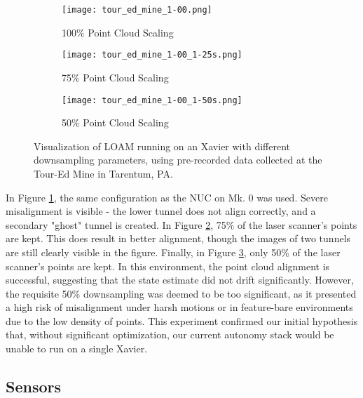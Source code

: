 \begin{figure}
	\centering
	\begin{subfigure}{0.3\textwidth}
		\texttt{[image: tour\_ed\_mine\_1-00.png]}
		\caption{100\% Point Cloud Scaling}
		\label{loam_xavier_100}
	\end{subfigure}		
	\hfill
	\begin{subfigure}{0.3\textwidth}
		\texttt{[image: tour\_ed\_mine\_1-00\_1-25s.png]}
		\caption{75\% Point Cloud Scaling}
		\label{loam_xavier_75}		
	\end{subfigure}
	\hfill
	\begin{subfigure}{0.3\textwidth}
		\texttt{[image: tour\_ed\_mine\_1-00\_1-50s.png]}
		\caption{50\% Point Cloud Scaling}
		\label{loam_xavier_50}
	\end{subfigure}	
	\caption[Visualization of LOAM running on an Xavier]{Visualization of LOAM running on an Xavier with different downsampling parameters, using pre-recorded data collected at the Tour-Ed Mine in Tarentum, PA.}
	\label{loam_xavier}
\end{figure}

In Figure \ref{loam_xavier_100}, the same configuration as the NUC on Mk. 0 was used. Severe misalignment is visible - the lower tunnel does not align correctly, and a secondary "ghost" tunnel is created. In Figure \ref{loam_xavier_75}, 75\% of the laser scanner's points are kept. This does result in better alignment, though the images of two tunnels are still clearly visible in the figure. Finally, in Figure \ref{loam_xavier_50}, only 50\% of the laser scanner's points are kept. In this environment, the point cloud alignment is successful, suggesting that the state estimate did not drift significantly. However, the requisite 50\% downsampling was deemed to be too significant, as it presented a high risk of misalignment under harsh motions or in feature-bare environments due to the low density of points. This experiment confirmed our initial hypothesis that, without significant optimization, our current autonomy stack would be unable to run on a single Xavier.


\subsection{Sensors}


